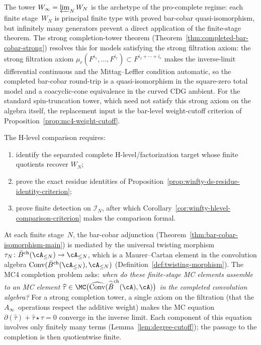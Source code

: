 \begin{example}
\label{ex:winfty-completion-frontier}

The tower $W_\infty = \varprojlim_N W_N$ is the archetype of the
pro-complete regime: each finite stage~$W_N$ is principal finite
type with proved bar-cobar quasi-isomorphism, but infinitely many
generators prevent a direct application of the finite-stage
theorem. The strong completion-tower theorem
(Theorem~\ref{thm:completed-bar-cobar-strong}) resolves this for
models satisfying the strong filtration axiom:
the strong filtration axiom
$\mu_r(F^{i_1},\dots,F^{i_r}) \subset F^{i_1+\cdots+i_r}$
makes the inverse-limit differential continuous and the
Mittag--Leffler condition automatic, so the completed bar-cobar
round-trip is a quasi-isomorphism in the square-zero total model and
a coacyclic-cone equivalence in the curved CDG ambient.
For the standard spin-truncation tower, which need not satisfy this
strong axiom on the algebra itself, the replacement input is the
bar-level weight-cutoff criterion of
Proposition~\ref{prop:mc4-weight-cutoff}.

The H-level comparison requires:
\begin{enumerate}
\item identify the separated complete H-level/factorization target whose finite quotients recover $W_N$;
\item prove the exact residue identities of Proposition~\ref{prop:winfty-ds-residue-identity-criterion};
\item prove finite detection on $\mathcal{I}_N$, after which Corollary~\ref{cor:winfty-hlevel-comparison-criterion} makes the comparison formal.
\end{enumerate}
\end{example}

At each finite stage~$N$, the bar-cobar adjunction
(Theorem~\ref{thm:bar-cobar-isomorphism-main}) is mediated by the
universal twisting morphism
$\tau_N \colon \bar B^{\mathrm{ch}}(\cA_{\le N}) \to \cA_{\le N}$,
which is a Maurer--Cartan element in the convolution algebra
$\operatorname{Conv}(\bar B^{\mathrm{ch}}(\cA_{\le N}),
\cA_{\le N})$
(Definition~\ref{def:twisting-morphism}).
The MC4 completion problem asks: \emph{when do these finite-stage
MC elements assemble to an MC element
$\widehat\tau \in
\MC\bigl(\widehat{\operatorname{Conv}}(\widehat{\bar B}^{\mathrm{ch}}(\cA),
\cA)\bigr)$
in the completed convolution algebra?}
For a strong completion tower, a single axiom on the filtration (that
the $A_\infty$~operations respect the additive weight) makes
the MC equation $\partial(\widehat\tau) + \widehat\tau \star
\widehat\tau = 0$ converge in the inverse limit. Each component
of this equation involves only finitely many terms
(Lemma~\ref{lem:degree-cutoff}); the passage to the completion is then
quotientwise finite.

